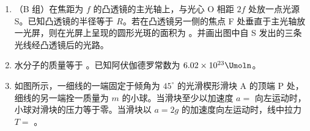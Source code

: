 \documentclass[\gkver]{gaokaozhenti}
\begin{document}
\begin{enumerate}
{\begin{enumerate}
	\item
	\onepicture[w=5.78cm]{}

\end{enumerate}
}

\item
（B 组）在焦距为 $f$ 的凸透镜的主光轴上，与光心 O 相距 $2f$ 处放一点光源 S。已知凸透镜的半径等于 $R$。若在凸透镜另一侧的焦点 F 处垂直于主光轴放一光屏，则在光屏上呈现的圆形光斑的面积为 。并画出图中自 S 发出的三条光线经凸透镜后的光路。
\onepicture[align=right, w=6.50cm]{}

\item
水分子的质量等于 。已知阿伏伽德罗常数为 $6.02\times10^{23}\Umoln$。

\item
如图所示，一细线的一端固定于倾角为 $45^{\circ}$ 的光滑楔形滑块 A 的顶端 P 处，细线的另一端拴一质量为 $m$ 的小球。当滑块至少以加速度 $a =$  向左运动时，小球对滑块的压力等于零。当滑块以 $a = 2g$ 的加速度向左运动时，线中拉力 $T =$ 。
\onepicture[align=right, w=4.20cm]{}


\end{enumerate}
\end{document}
